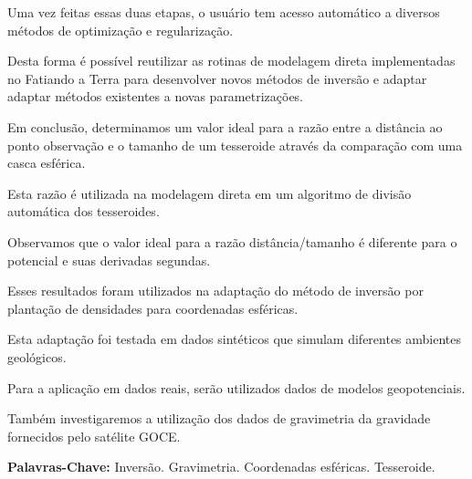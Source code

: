\documentclass[12pt]{letter}
\begin{document}
\begin{flushleft}
Uma vez feitas essas duas etapas, o usuário tem acesso automático a diversos
métodos de optimização e regularização.

Desta forma é possível reutilizar as rotinas de modelagem direta implementadas
no Fatiando a Terra para desenvolver novos métodos de inversão e adaptar
adaptar métodos existentes a novas parametrizações.


Em conclusão,
determinamos um valor ideal para a razão entre a distância ao ponto observação
e o tamanho de um tesseroide através da comparação com uma casca esférica.

Esta razão é utilizada na modelagem direta em um algoritmo de divisão automática dos tesseroides.

Observamos que o valor ideal para a razão distância/tamanho é diferente para o
potencial e suas derivadas segundas.

Esses resultados foram utilizados na adaptação do método de inversão por
plantação de densidades para coordenadas esféricas.

Esta adaptação foi testada em dados sintéticos que simulam diferentes ambientes
geológicos.

Para a aplicação em dados reais, serão utilizados dados de modelos
geopotenciais.

Também investigaremos a utilização dos dados de gravimetria da gravidade
fornecidos pelo satélite GOCE.



\vspace{10 mm}
\textbf{Palavras-Chave:}
Inversão. Gravimetria. Coordenadas esféricas. Tesseroide.

\end{flushleft}
\end{document}
